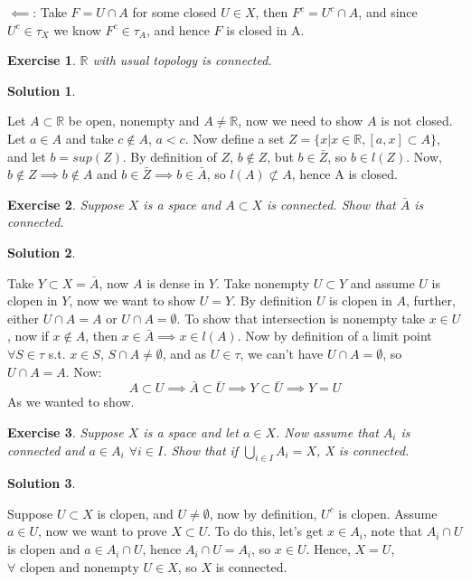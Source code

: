 \documentclass[11pt,a4paper]{article}
\newtheorem{Ex}{Exercise}
\newtheorem{Sol}{Solution}
\begin{document}
\noindent $\impliedby$: Take $F = U \cap A$ for some closed $U \in X$, then $F^c = U^c \cap A$, and since $U^c \in \tau_X$ we know $F^c \in \tau_A$, and hence $F$ is closed in A.

\begin{Ex}
  $\mathbb{R}$ with usual topology is connected.
\end{Ex}
 
\begin{Sol} \end{Sol}
Let $A \subset \mathbb{R}$ be open, nonempty and $A \neq \mathbb{R}$, now we need to show $A$ is not closed. Let $a \in A$ and take $c \not \in A$, $a < c$. Now define a set $Z = \{ x| x \in \mathbb{R}, [a,x] \subset A \}$, and let $b = sup(Z)$. By definition of $Z$, $b \not \in Z$, but $b \in \bar{Z}$, so $b \in l(Z) $. Now, $b \not\in Z \implies b \not\in A$ and $b \in \bar{Z} \implies b \in \bar{A}$, so $l(A) \not \subset A$, hence A is closed.  

\begin{Ex}
	Suppose $X$ is a space and $A \subset X$ is connected. Show that $\bar{A}$ is connected.
\end{Ex}

\begin{Sol} \end{Sol}
\noindent Take $Y \subset X = \bar{A}$, now $A$ is dense in $Y$. Take nonempty $U \subset Y$ and assume $U$ is clopen in $Y$, now we want to show $U = Y$. By definition $U$ is clopen in $A$, further, either $U \cap A = A$ or $U \cap A = \emptyset$. To show that intersection is nonempty take $x \in U$, now if $x \not\in A$, then $x \in \bar{A} \implies x \in l(A)$. Now by definition of a limit point $\forall S \in \tau$ s.t. $x \in S$, $S \cap A \neq \emptyset$, and as $U \in \tau$, we can't have $U \cap A = \emptyset$, so $U \cap A = A$. Now: $$A \subset U \implies \bar{A} \subset \bar{U} \implies Y \subset \bar{U} \implies Y = U$$ As we wanted to show.

\begin{Ex}
	Suppose $X$ is a space and let $a \in X$. Now assume that $A_i$ is connected and $a \in A_i$ $\forall i \in I$. Show that if $\bigcup_{i \in I}A_i = X$, X is connected. 
\end{Ex}

\begin{Sol} \end{Sol}
\noindent Suppose $U \subset X$ is clopen, and $U \neq \emptyset$, now by definition, $U^c$ is clopen. Assume $a \in U$, now we want to prove $X \subset U$. To do this, let's get $x \in A_i$, note that $A_i \cap U$ is clopen and $a \in A_i \cap U$, hence $A_i \cap U = A_i$, so $x \in U$. Hence, $X = U$, $\forall \text{ clopen and nonempty } U \in X$, so $X$ is connected.
\end{document}
